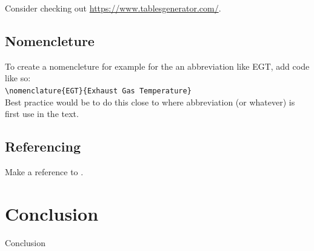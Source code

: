 \documentclass[11pt,a4paper,twoside]{article}
\begin{document}
Consider checking out \url{https://www.tablesgenerator.com/}.

\subsection{Nomencleture}
To create a nomencleture for example for the an abbreviation like EGT, add code like so:\\
\verb=\nomenclature{EGT}{Exhaust Gas Temperature}= \\
Best practice would be to do this close to where abbreviation (or whatever) is first use in the text.

\subsection{Referencing}
Make a reference to \citep{NormanS.Nise2012}.

\section{Conclusion}
Conclusion

\newpage
\printbibliography[heading=bibintoc]
\printnomenclature
\end{document}
